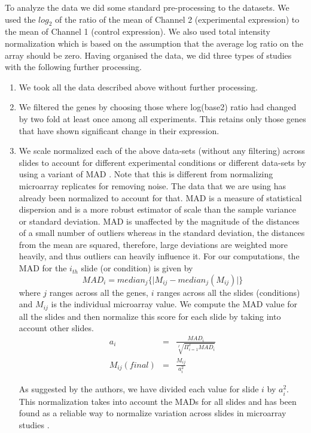 To analyze the data we did some standard pre-processing to the datasets. We used the $log_{2}$ of the ratio of the mean of Channel 2 (experimental expression) to the mean of Channel 1 (control expression). We also used total intensity normalization which is based on the assumption that the average log ratio on the array should be zero. Having organised the data, we did three types of studies with the following further processing.

\begin{enumerate}
\item We took all the data described above without further processing.

\item We filtered the genes by choosing those where log(base2) ratio had changed by two fold at least once among all experiments. This retains only those genes that have shown significant change in their expression.

\item We scale normalized each of the above data-sets (without any filtering) across slides to account for different experimental conditions or different data-sets by using a variant of \ac{MAD} \citep{yang02normalization}. Note that this is different from normalizing microarray replicates for removing noise. The data that we are using has already been normalized to account for that. \ac{MAD} is a measure of statistical dispersion and is a more robust estimator of scale than the sample variance or standard deviation. MAD is unaffected by the magnitude of the distances of a small number of outliers whereas in the standard deviation, the distances from the mean are squared, therefore, large deviations are weighted more heavily, and thus outliers can heavily influence it. For our computations, the \ac{MAD} for the $i_{th}$ slide (or condition) is given by
\begin{equation}
MAD_{i}=median_{j}\{\mid M_{ij}-median_{j}(M_{ij}) \mid\}
\end{equation} 
where $j$ ranges across all the genes, $i$ ranges across all the slides (conditions) and $M_{ij}$ is the individual microarray value. We compute the \ac{MAD} value for all the slides and then normalize this score for each slide by taking into account other slides.
\begin{eqnarray}
{a}_{i}&=&\frac{MAD_{i}}{\sqrt[I]{\Pi_{i=1}^{I}MAD_{i}}} \\
M_{ij}(final) &=& \frac{M_{ij}}{a_{i}^{2}} 
\end{eqnarray}

As suggested by the authors, we have divided each value for slide $i$ by $a_{i}^{2}$. This normalization takes into account the \acp{MAD} for all slides and has been found as a reliable way to normalize variation across slides in microarray studies \citep{yang02normalization}.

\end{enumerate}


